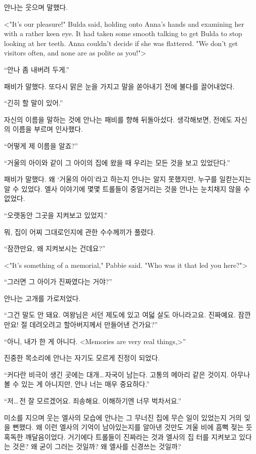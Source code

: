 안나는 웃으며 말했다.

<"It's our pleasure!" Bulda said, holding onto Anna's hands and examining her with a rather keen eye. It had taken some smooth talking to get Bulda to stop looking at her teeth. Anna couldn't decide if she was flattered. "We don't get visitors often, and none are as polite as you!">

``안나 좀 내버려 두게.''

패비가 말했다. 또다시 맑은 눈을 가지고 말을 쏟아내기 전에 불다를 끌어내었다.

``긴히 할 말이 있어.''

자신의 이름을 말하는 것에 안나는 패비를 향해 뒤돌아섰다. 생각해보면, 전에도 자신의 이름을 부르며 인사했다.

``어떻게 제 이름을 알죠?''

``거울의 아이와 같이 그 아이의 집에 왔을 때 우리는 모든 것을 보고 있었단다.''

패비가 말했다. 왜 `거울의 아이'라고 하는지 안나는 알지 못했지만, 누구를 일컫는지는 알 수 있었다. 엘사 이야기에 몇몇 트롤들이 중얼거리는 것을 안나는 눈치채지 않을 수 없었다.

``오랫동안 그곳을 지켜보고 있었지.''

뭐, 집이 어찌 그대로인지에 관한 수수께끼가 풀렸다.

``잠깐만요, 왜 지켜보시는 건데요?''

<"It's something of a memorial," Pabbie said. "Who was it that led you here?">

``그러면 그 아이가 진짜였다는 거야?''

안나는 고개를 가로저었다.

``그건 말도 안 돼요. 여왕님은 서던 제도에 있고 여덟 살도 아니라고요. 진짜예요. 잠깐만요! 절 데려오려고 할아버지께서 만들어낸 건가요?''

``아니, 내가 한 게 아니다. <Memories are very real things,>''

진중한 목소리에 안나는 자기도 모르게 진정이 되었다.

``커다란 비극이 생긴 곳에는 대개\ldots\,자국이 남는다. 고통의 메아리 같은 것이지. 아무나 볼 수 있는 게 아니지만, 안나 너는 매우 중요하다.''

``저\ldots\,전 잘 모르겠어요. 죄송해요. 이해하기엔 너무 벅차서요.''

미소를 지으며 웃는 엘사의 모습에 안나는 그 무너진 집에 무슨 일이 있었는지 거의 잊을 뻔했다. 왜 이런 엘사의 기억이 남아있는지를 알아낸 것만도 겨울 비에 흠뻑 젖는 듯 혹독한 깨달음이었다. 거기에다 트롤들이 진짜라는 것과 엘사의 집 터를 지켜보고 있다는 것은? 왜 굳이 그러는 것일까? 왜 엘사를 신경쓰는 것일까?

